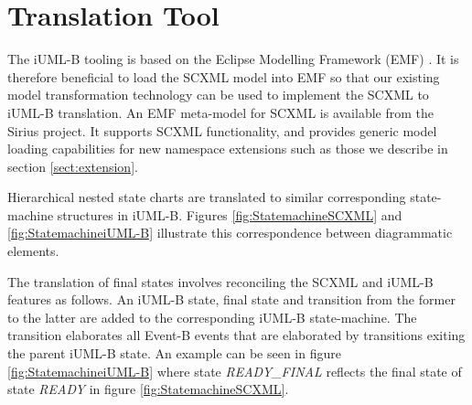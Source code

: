 
\section{Translation Tool}

The iUML-B tooling is based on the Eclipse Modelling Framework (EMF) \cite{steinberg2009emf}. 
It is therefore beneficial to load the SCXML model into EMF so that our existing model transformation technology can be used to 
implement the SCXML to iUML-B translation. 
An EMF meta-model for SCXML is available from the Sirius \cite{siriuswebsite} project. 
It supports SCXML functionality, and provides generic model
loading capabilities for new namespace extensions such as those we 
describe in section \ref{sect:extension}.

Hierarchical nested state charts are translated to similar corresponding  state-machine structures in iUML-B.  
Figures \ref{fig:StatemachineSCXML} and \ref{fig:StatemachineiUML-B} illustrate this correspondence between diagrammatic elements. 

The translation of final states involves reconciling the SCXML and iUML-B features as follows.
An iUML-B state, final state and transition from the former to the latter are added to the corresponding iUML-B state-machine. 
The transition elaborates all Event-B events that are elaborated by transitions exiting the parent iUML-B state. 
An example can be seen in figure \ref{fig:StatemachineiUML-B} where state \emph{READY\_FINAL} reflects the final state of state \emph{READY} in figure \ref{fig:StatemachineSCXML}.





